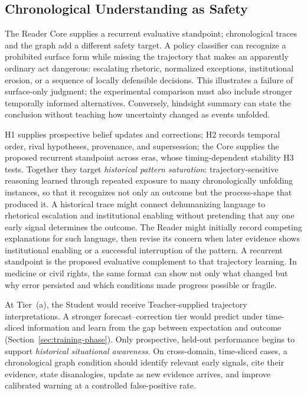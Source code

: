 \documentclass[11pt]{article}
\begin{document}
\subsection{Chronological Understanding as Safety}\label{sec:chronological-safety}

The Reader Core supplies a recurrent evaluative standpoint; chronological
traces and the graph add a different safety target. A policy classifier can
recognize a prohibited surface form while missing the trajectory that makes an
apparently ordinary act dangerous: escalating rhetoric, normalized exceptions,
institutional erosion, or a sequence of locally defensible decisions.
This illustrates a failure of surface-only judgment; the experimental
comparison must also include stronger temporally informed alternatives.
Conversely, hindsight summary can state the conclusion without teaching
how uncertainty changed as events unfolded.

H1 supplies prospective belief updates and corrections; H2 records temporal
order, rival hypotheses, provenance, and supersession; the Core supplies
the proposed recurrent standpoint across eras, whose timing-dependent
stability H3 tests. Together they target \emph{historical pattern
saturation}: trajectory-sensitive reasoning learned through repeated exposure
to many chronologically unfolding instances, so that it recognizes not only an
outcome but the process-shape that produced it. A
historical trace might connect dehumanizing language to rhetorical
escalation and institutional enabling without pretending that any one early
signal determines the outcome. The Reader might initially record competing
explanations for such language, then revise its concern when later evidence
shows institutional enabling or a successful interruption of the pattern.
A recurrent standpoint is the proposed evaluative complement to that
trajectory learning.
In medicine or civil rights, the same format can
show not only what changed but why error persisted and which conditions made
progress possible or fragile.

At Tier~(a), the Student would receive Teacher-supplied trajectory
interpretations. A stronger forecast--correction tier would predict under
time-sliced information and learn from the gap between expectation and outcome
(Section~\ref{sec:training-phase}). Only prospective, held-out performance
begins to support \emph{historical situational awareness}. On cross-domain,
time-sliced cases, a chronological graph condition should identify relevant
early signals, cite their evidence, state disanalogies, update as new evidence
arrives, and improve calibrated warning at a controlled false-positive rate.
\end{document}
